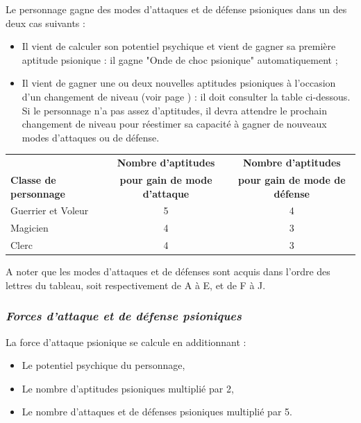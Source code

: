 \documentclass[11pt]{article}
\begin{document}
{Le personnage gagne des modes d'attaques et de défense psioniques dans un des deux cas suivants :

\bigskip

\begin{itemize}
\item Il vient de calculer son potentiel psychique et vient de gagner sa première aptitude psionique : il gagne "Onde de choc psionique" automatiquement ;
\item Il vient de gagner une ou deux nouvelles aptitudes psioniques à l'occasion d'un changement de niveau (voir page \pageref{aptitudes-gain}) : il doit consulter la table ci-dessous. Si le personnage n'a pas assez d'aptitudes, il devra attendre le prochain changement de niveau pour réestimer sa capacité à gagner de nouveaux modes d'attaques ou de défense.
\end{itemize}

\bigskip

\begin{tabular}{lcc}
& \textbf{Nombre d'aptitudes} & \textbf{Nombre d'aptitudes} \\
\textbf{Classe de personnage} & \textbf{pour gain de mode d'attaque} & \textbf{pour gain de mode de défense} \\
Guerrier et Voleur & 5 & 4 \\
Magicien & 4 & 3 \\
Clerc & 4 & 3 \\
\end{tabular}

\bigskip

A noter que les modes d'attaques et de défenses sont acquis dans l'ordre des lettres du tableau, soit respectivement de A à E, et de F à J.

\subsubsection*{\textit{Forces d'attaque et de défense psioniques}}

La force d'attaque psionique se calcule en additionnant :

\bigskip

\begin{itemize}
\item Le potentiel psychique du personnage,
\item Le nombre d'aptitudes psioniques multiplié par 2,
\item Le nombre d'attaques et de défenses psioniques multiplié par 5.
\end{itemize}

}
\end{document}
